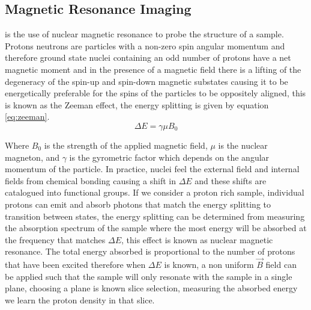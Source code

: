 


\subsection{Magnetic Resonance Imaging}
\mri is the use of nuclear magnetic resonance to probe the structure of a sample. Protons neutrons are particles with a non-zero spin angular momentum and therefore ground state nuclei containing an odd number of protons have a net magnetic moment and in the presence of a magnetic field there is a lifting of the degeneracy of the spin-up and spin-down magnetic substates causing it to be energetically preferable for the spins of the particles to be oppositely aligned, this is known as the Zeeman effect, the energy splitting is given by equation \ref{eq:zeeman}.
\begin{equation}
    \Delta E = \gamma \mu B_0
    \label{eq:zeeman}
\end{equation}

Where $B_0$ is the strength of the applied magnetic field, $\mu$ is the nuclear magneton, and $\gamma$ is the gyrometric factor which depends on the angular momentum of the particle. \cite{griffiths2005introduction} In practice, nuclei feel the external field and internal fields from chemical bonding causing a shift in $\Delta E$ and these shifts are catalogued into functional groups. If we consider a proton rich sample, individual protons can emit and absorb photons that match the energy splitting to transition between states, the energy splitting can be determined from measuring the absorption spectrum of the sample where the most energy will be absorbed at the frequency that matches $\Delta E$, this effect is known as nuclear magnetic resonance. \cite{bushberg2011essential} The total energy absorbed is proportional to the number of protons that have been excited therefore when $\Delta E$ is known, a non uniform $\vec{B}$ field can be applied such that the sample will only resonate with the sample in a single plane, choosing a plane is known slice selection, measuring the absorbed energy we learn the proton density in that slice.

